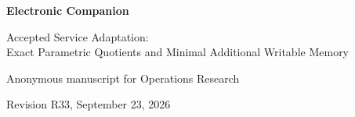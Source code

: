 \documentclass[11pt,letterpaper]{article}
\theoremstyle{definition}\newtheorem{assumption}[theorem]{Assumption}
\begin{document}
\begin{center}{\Large\bfseries Electronic Companion}\par\medskip
{\large Accepted Service Adaptation:\\ Exact Parametric Quotients and Minimal Additional Writable Memory}\par\medskip
Anonymous manuscript for Operations Research\par
Revision R33, September 23, 2026
\end{center}








\end{document}
